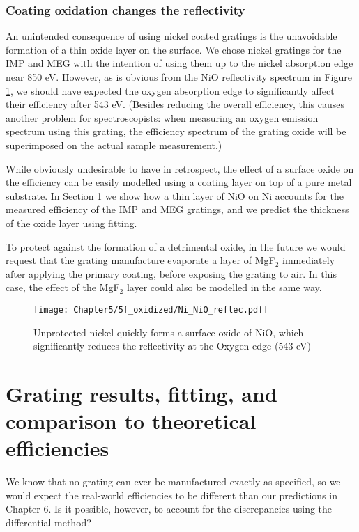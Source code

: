\subsubsection{Coating oxidation changes the reflectivity}
An unintended consequence of using nickel coated gratings is the unavoidable formation of a thin oxide layer on the surface.  We chose nickel gratings for the IMP and MEG with the intention of using them up to the nickel absorption edge near 850 eV.  However, as is obvious from the NiO reflectivity spectrum in Figure \ref{5f}, we should have expected the oxygen absorption edge to significantly affect their efficiency after 543 eV.  (Besides reducing the overall efficiency, this causes another problem for spectroscopists: when measuring an oxygen emission spectrum using this grating, the efficiency spectrum of the grating oxide will be superimposed on the actual sample measurement.)

While obviously undesirable to have in retrospect, the effect of a surface oxide on the efficiency can be easily modelled using a coating layer on top of a pure metal substrate. In Section \ref{gratingResults} we show how a thin layer of NiO on Ni accounts for the measured efficiency of the IMP and MEG gratings, and we predict the thickness of the oxide layer using fitting.

To protect against the formation of a detrimental oxide, in the future we would request that the grating manufacture evaporate a layer of MgF$_2$ immediately after applying the primary coating, before exposing the grating to air.  In this case, the effect of the MgF$_2$ layer could also be modelled in the same way.


\begin{figure}[htbp] %
   \centering
   \texttt{[image: Chapter5/5f\_oxidized/Ni\_NiO\_reflec.pdf]} 
   \caption{Unprotected nickel quickly forms a surface oxide of NiO, which significantly reduces the reflectivity at the Oxygen edge (543 eV) }
   \label{5f}
\end{figure}

\section{Grating results, fitting, and comparison to theoretical efficiencies}
\label{gratingResults}
We know that no grating can ever be manufactured exactly as specified, so we would expect the real-world efficiencies to be different than our predictions in Chapter 6.  Is it possible, however, to account for the discrepancies using the differential method?


